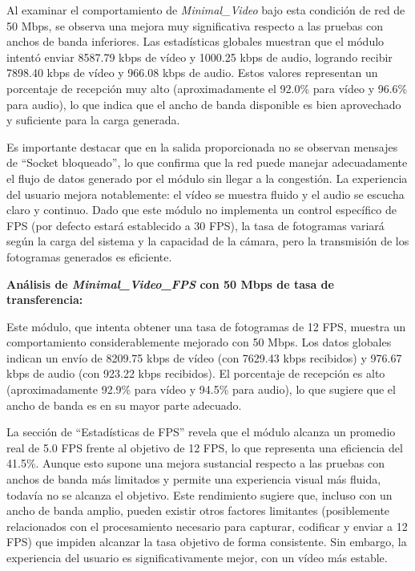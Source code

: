 Al examinar el comportamiento de \textit{Minimal\_Video} bajo esta condición de red de 50 Mbps, se observa una mejora muy significativa respecto a las pruebas con anchos de banda inferiores. Las estadísticas globales muestran que el módulo intentó enviar 8587.79 kbps de vídeo y 1000.25 kbps de audio, logrando recibir 7898.40 kbps de vídeo y 966.08 kbps de audio. Estos valores representan un porcentaje de recepción muy alto (aproximadamente el 92.0\% para vídeo y 96.6\% para audio), lo que indica que el ancho de banda disponible es bien aprovechado y suficiente para la carga generada.
\vspace{\baselineskip}

Es importante destacar que en la salida proporcionada no se observan mensajes de ``Socket bloqueado'', lo que confirma que la red puede manejar adecuadamente el flujo de datos generado por el módulo sin llegar a la congestión. La experiencia del usuario mejora notablemente: el vídeo se muestra fluido y el audio se escucha claro y continuo. Dado que este módulo no implementa un control específico de FPS (por defecto estará establecido a 30 FPS), la tasa de fotogramas variará según la carga del sistema y la capacidad de la cámara, pero la transmisión de los fotogramas generados es eficiente.

\vspace{\baselineskip}

\textbf{Análisis de \textit{Minimal\_Video\_FPS} con 50 Mbps de tasa de transferencia:}
\vspace{\baselineskip}

Este módulo, que intenta obtener una tasa de fotogramas de 12 FPS, muestra un comportamiento considerablemente mejorado con 50 Mbps. Los datos globales indican un envío de 8209.75 kbps de vídeo (con 7629.43 kbps recibidos) y 976.67 kbps de audio (con 923.22 kbps recibidos). El porcentaje de recepción es alto (aproximadamente 92.9\% para vídeo y 94.5\% para audio), lo que sugiere que el ancho de banda es en su mayor parte adecuado.
\vspace{\baselineskip}

La sección de ``Estadísticas de FPS'' revela que el módulo alcanza un promedio real de 5.0 FPS frente al objetivo de 12 FPS, lo que representa una eficiencia del 41.5\%. Aunque esto supone una mejora sustancial respecto a las pruebas con anchos de banda más limitados y permite una experiencia visual más fluida, todavía no se alcanza el objetivo. Este rendimiento sugiere que, incluso con un ancho de banda amplio, pueden existir otros factores limitantes (posiblemente relacionados con el procesamiento necesario para capturar, codificar y enviar a 12 FPS) que impiden alcanzar la tasa objetivo de forma consistente. Sin embargo, la experiencia del usuario es significativamente mejor, con un vídeo más estable.

